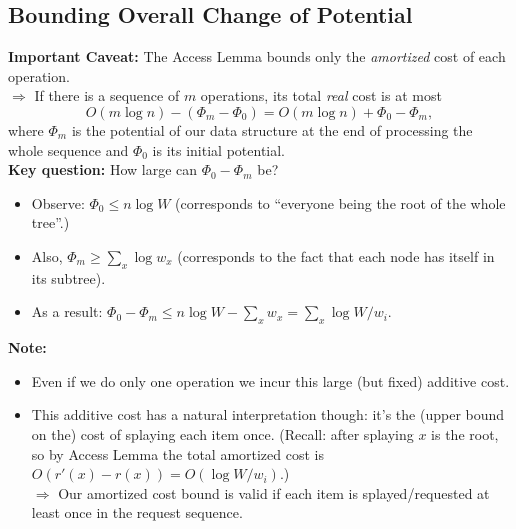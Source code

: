 \documentclass{article}
\begin{document}

\subsection{Bounding Overall Change of Potential}

{\bf Important Caveat:} The Access Lemma bounds only the {\em amortized} cost of each operation.\\
$\Rightarrow$ If there is a sequence of $m$ operations, its total {\em real} cost is at most 
\[
O(m \log n) - \left(\Phi_m - \Phi_0\right)=O(m \log n) + \Phi_0 - \Phi_m,
\]
where $\Phi_m$ is the potential of our data structure at the end of processing the whole sequence and $\Phi_0$ is its initial potential.\\

{\bf Key question:} How large can $\Phi_0-\Phi_m$ be?

\begin{itemize}
\item Observe: $\Phi_0 \leq n\log W$ (corresponds to ``everyone being the root of the whole tree''.)
\item Also, $\Phi_m \geq \sum_x \log w_x$ (corresponds to the fact that each node has itself in its subtree).
\item As a result:
$\Phi_0-\Phi_m\leq n\log W - \sum_x w_x = \sum_x \log W/w_i$.

\end{itemize}

{\bf Note:} 

\begin{itemize}
\item Even if we do only one operation we incur this large (but fixed) additive cost. 
\item This additive cost has a natural interpretation though: it's the (upper bound on the) cost of splaying each item once. (Recall: after splaying $x$ is the root, so by Access Lemma the total amortized cost is $O(r'(x)-r(x))=O(\log W/w_i)$.)\\
$\Rightarrow$ Our amortized cost bound is valid if each item is splayed/requested  at least once in the request sequence.
\end{itemize}
\end{document}
